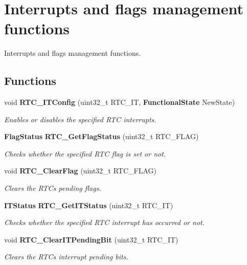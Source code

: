 \section{Interrupts and flags management functions}
\label{group__RTC__Group13}


Interrupts and flags management functions.  


\subsection*{Functions}
\begin{DoxyCompactItemize}
\item 
void \textbf{ R\+T\+C\+\_\+\+I\+T\+Config} (uint32\+\_\+t R\+T\+C\+\_\+\+IT, \textbf{ Functional\+State} New\+State)
\begin{DoxyCompactList}\small\item\em Enables or disables the specified R\+TC interrupts. \end{DoxyCompactList}\item 
\textbf{ Flag\+Status} \textbf{ R\+T\+C\+\_\+\+Get\+Flag\+Status} (uint32\+\_\+t R\+T\+C\+\_\+\+F\+L\+AG)
\begin{DoxyCompactList}\small\item\em Checks whether the specified R\+TC flag is set or not. \end{DoxyCompactList}\item 
void \textbf{ R\+T\+C\+\_\+\+Clear\+Flag} (uint32\+\_\+t R\+T\+C\+\_\+\+F\+L\+AG)
\begin{DoxyCompactList}\small\item\em Clears the R\+TC\textquotesingle{}s pending flags. \end{DoxyCompactList}\item 
\textbf{ I\+T\+Status} \textbf{ R\+T\+C\+\_\+\+Get\+I\+T\+Status} (uint32\+\_\+t R\+T\+C\+\_\+\+IT)
\begin{DoxyCompactList}\small\item\em Checks whether the specified R\+TC interrupt has occurred or not. \end{DoxyCompactList}\item 
void \textbf{ R\+T\+C\+\_\+\+Clear\+I\+T\+Pending\+Bit} (uint32\+\_\+t R\+T\+C\+\_\+\+IT)
\begin{DoxyCompactList}\small\item\em Clears the R\+TC\textquotesingle{}s interrupt pending bits. \end{DoxyCompactList}\end{DoxyCompactItemize}


